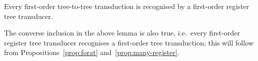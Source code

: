 \begin{theorem}\label{thm:stt}
    Every first-order tree-to-tree transduction is recognised by a first-order register tree transducer. 
\end{theorem}
The converse inclusion in the above lemma is also true, i.e.~every first-order register tree transducer recognises a first-order tree transduction; this will follow from Propositions~\ref{prop:forat} and~\ref{prop:many-register}. 





